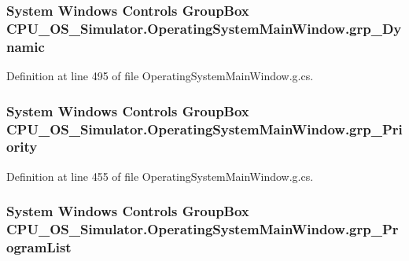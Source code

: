 \subsubsection[{grp\+\_\+\+Dynamic}]{\setlength{\rightskip}{0pt plus 5cm}System Windows Controls Group\+Box C\+P\+U\+\_\+\+O\+S\+\_\+\+Simulator.\+Operating\+System\+Main\+Window.\+grp\+\_\+\+Dynamic\hspace{0.3cm}{\ttfamily [package]}}\label{class_c_p_u___o_s___simulator_1_1_operating_system_main_window_a13fd6e707bf77777692f0fe004a0635b}


Definition at line 495 of file Operating\+System\+Main\+Window.\+g.\+cs.

\hypertarget{class_c_p_u___o_s___simulator_1_1_operating_system_main_window_a45f777ff3178acfefdffb311366ab786}{}
\subsubsection[{grp\+\_\+\+Priority}]{\setlength{\rightskip}{0pt plus 5cm}System Windows Controls Group\+Box C\+P\+U\+\_\+\+O\+S\+\_\+\+Simulator.\+Operating\+System\+Main\+Window.\+grp\+\_\+\+Priority\hspace{0.3cm}{\ttfamily [package]}}\label{class_c_p_u___o_s___simulator_1_1_operating_system_main_window_a45f777ff3178acfefdffb311366ab786}


Definition at line 455 of file Operating\+System\+Main\+Window.\+g.\+cs.

\hypertarget{class_c_p_u___o_s___simulator_1_1_operating_system_main_window_a9dca0481c9d2ec99d42298352858be2b}{}
\subsubsection[{grp\+\_\+\+Program\+List}]{\setlength{\rightskip}{0pt plus 5cm}System Windows Controls Group\+Box C\+P\+U\+\_\+\+O\+S\+\_\+\+Simulator.\+Operating\+System\+Main\+Window.\+grp\+\_\+\+Program\+List\hspace{0.3cm}{\ttfamily [package]}}\label{class_c_p_u___o_s___simulator_1_1_operating_system_main_window_a9dca0481c9d2ec99d42298352858be2b}



